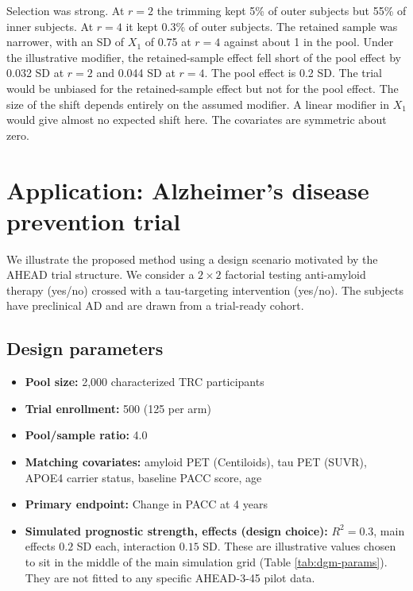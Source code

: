 \documentclass[
  11pt,
]{article}
\providecommand{\tightlist}{%
  \setlength{\itemsep}{0pt}\setlength{\parskip}{0pt}}
\begin{document}
Selection was strong. At \(r = 2\) the trimming kept
5\%
of outer subjects but
55\%
of inner subjects. At \(r = 4\) it kept
0.3\%
of outer subjects. The retained sample was narrower, with an
SD of \(X_1\) of 0.75
at \(r = 4\) against about 1 in the pool. Under the
illustrative modifier, the retained-sample effect fell short
of the pool effect by
0.032 SD at \(r = 2\) and
0.044 SD at \(r = 4\). The
pool effect is 0.2 SD. The trial would be unbiased for the
retained-sample effect but not for the pool effect. The size
of the shift depends entirely on the assumed modifier. A
linear modifier in \(X_1\) would give almost no expected shift
here. The covariates are symmetric about zero.

\section{Application: Alzheimer's disease prevention trial}\label{application-alzheimers-disease-prevention-trial}

We illustrate the proposed method using a design scenario
motivated by the AHEAD trial structure. We consider a \(2
\times 2\) factorial testing anti-amyloid therapy (yes/no)
crossed with a tau-targeting intervention (yes/no). The
subjects have preclinical AD and are drawn from a
trial-ready cohort.

\subsection{Design parameters}\label{design-parameters}

\begin{itemize}
\tightlist
\item
  \textbf{Pool size:} 2,000 characterized TRC participants
\item
  \textbf{Trial enrollment:} 500 (125 per arm)
\item
  \textbf{Pool/sample ratio:} 4.0
\item
  \textbf{Matching covariates:} amyloid PET (Centiloids), tau PET
  (SUVR), APOE4 carrier status, baseline PACC score, age
\item
  \textbf{Primary endpoint:} Change in PACC at 4 years
\item
  \textbf{Simulated prognostic strength, effects (design choice):}
  \(R^2 = 0.3\), main effects \(0.2\) SD each, interaction \(0.15\)
  SD. These are illustrative values chosen to sit in the
  middle of the main simulation grid (Table
  \ref{tab:dgm-params}). They are not fitted to any specific
  AHEAD-3-45 pilot data.
\end{itemize}
\end{document}
